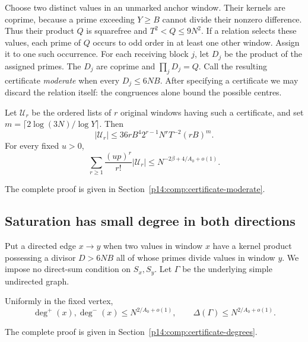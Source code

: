 Choose two distinct values in an unmarked anchor window. Their kernels
are coprime, because a prime exceeding $Y\ge B$ cannot divide their
nonzero difference. Thus their product $Q$ is squarefree and
$T^2<Q\le9N^2$. If a relation selects these values, each prime of $Q$
occurs to odd order in at least one other window. Assign it to one such
occurrence. For each receiving block $j$, let $D_j$ be the product of
the assigned primes. The $D_j$ are coprime and $\prod_jD_j=Q$.
Call the resulting certificate \emph{moderate} when every $D_j\le6NB$.
After specifying a certificate we may discard the relation itself:
the congruences alone bound the possible centres.

\begin{lemma}
\label{p1:core:moderate}
Let $\mathcal U_r$ be the ordered lists of $r$ original windows having
such a certificate, and set
$m=\lceil 2\log(3N)/\log Y\rceil$. Then
\begin{equation}
 |\mathcal U_r|
 \le36rB^4 2^{r-1}N^rT^{-2}(rB)^m.
 \label{p1:core:moderate-count}
\end{equation}
For every fixed $u>0$,
\begin{equation}
 \sum_{r\ge1}\frac{(up)^r}{r!}|\mathcal U_r|
 \le N^{-2\beta+4/A_0+o(1)}.
 \label{p1:core:moderate-baseline}
\end{equation}
\end{lemma}
\noindent The complete proof is given in Section~\ref{p14:comp:certificate-moderate}.


\subsection{Saturation has small degree in both directions}

Put a directed edge $x\to y$ when two values in window $x$ have a
kernel product possessing a divisor $D>6NB$ all of whose primes divide
values in window $y$. We impose no direct-sum condition on $S_x,S_y$.
Let $\Gamma$ be the underlying simple undirected graph.

\begin{lemma}
\label{p1:core:degrees}
Uniformly in the fixed vertex,
\begin{equation}
 \deg^+(x),\deg^-(x)\le N^{2/A_0+o(1)},
 \qquad \Delta(\Gamma)\le N^{2/A_0+o(1)}.
 \label{p1:core:degree-bound}
\end{equation}
\end{lemma}
\noindent The complete proof is given in Section~\ref{p14:comp:certificate-degrees}.


